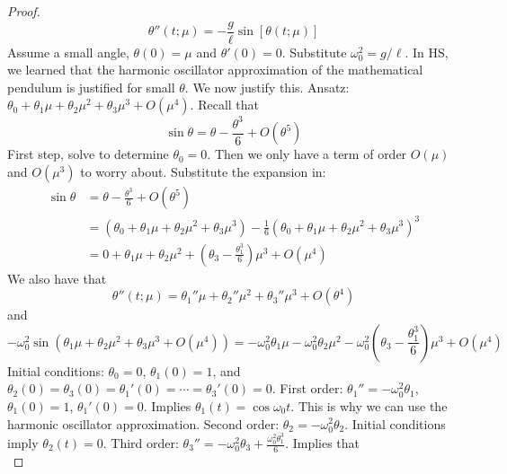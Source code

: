 \documentclass[../psets.tex]{subfiles}
\begin{document}
\begin{enumerate}
\begin{proof}
        \begin{equation*}
            \theta''(t;\mu) = -\frac{g}{\ell}\sin[\theta(t;\mu)]
        \end{equation*}
        Assume a small angle, $\theta(0)=\mu$ and $\theta'(0)=0$.
        Substitute $\omega_0^2=g/\ell$.
        In HS, we learned that the harmonic oscillator approximation of the mathematical pendulum is justified for small $\theta$. We now justify this.
        Ansatz: $\theta_0+\theta_1\mu+\theta_2\mu^2+\theta_3\mu^3+O(\mu^4)$.
        Recall that
        \begin{equation*}
            \sin\theta = \theta-\frac{\theta^3}{6}+O(\theta^5)
        \end{equation*}
        First step, solve to determine $\theta_0=0$.
        Then we only have a term of order $O(\mu)$ and $O(\mu^3)$ to worry about.
        Substitute the expansion in:
        \begin{align*}
            \sin\theta &= \theta-\frac{\theta^3}{6}+O(\theta^5)\\
            &= \left( \theta_0+\theta_1\mu+\theta_2\mu^2+\theta_3\mu^3 \right)-\frac{1}{6}\left( \theta_0+\theta_1\mu+\theta_2\mu^2+\theta_3\mu^3 \right)^3\\
            &= 0+\theta_1\mu+\theta_2\mu^2+\left( \theta_3-\frac{\theta_1^3}{6} \right)\mu^3+O(\mu^4)
        \end{align*}
        We also have that
        \begin{equation*}
            \theta''(t;\mu) = \theta_1''\mu+\theta_2''\mu^2+\theta_3''\mu^3+O(\theta^4)
        \end{equation*}
        and
        \begin{equation*}
            -\omega_0^2\sin(\theta_1\mu+\theta_2\mu^2+\theta_3\mu^3+O(\mu^4)) = -\omega_0^2\theta_1\mu-\omega_0^2\theta_2\mu^2-\omega_0^2\left( \theta_3-\frac{\theta_1^3}{6} \right)\mu^3+O(\mu^4)
        \end{equation*}
        Initial conditions: $\theta_0=0$, $\theta_1(0)=1$, and $\theta_2(0) = \theta_3(0) = \theta_1'(0) = \cdots = \theta_3'(0) = 0$.
        First order: $\theta_1''=-\omega_0^2\theta_1$, $\theta_1(0)=1$, $\theta_1'(0)=0$. Implies $\theta_1(t)=\cos\omega_0t$. This is why we can use the harmonic oscillator approximation.
        Second order: $\theta_2=-\omega_0^2\theta_2$. Initial conditions imply $\theta_2(t)=0$.
        Third order: $\theta_3''=-\omega_0^2\theta_3+\frac{\omega_0^2\theta_1^3}{6}$. Implies that
        \begin{equation*}

\end{equation*}
\end{proof}
\end{enumerate}
\end{document}
